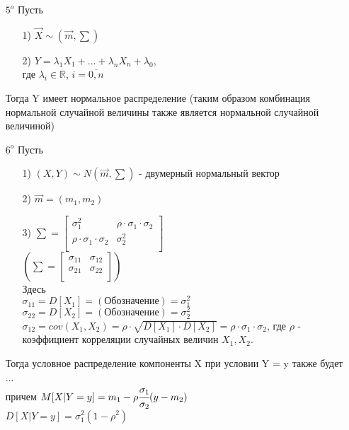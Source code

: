\begin{enumerate}
	\item[$5^o$] Пусть\\
	\begin{enumerate}
		\item[1)] $\vec{X} \sim (\vec{m}, \sum)$
		\item[2)] $Y = \lambda_1 X_1 + \ldots + \lambda_n X_n + \lambda_0$,\\
		где $\lambda_i \in \mathbb{R}$, $i = \overline{0, n}$
	\end{enumerate}
	Тогда Y имеет нормальное распределение (таким образом комбинация  нормальной случайной величины также является нормальной случайной величиной)
	
	\item[$6^o$] Пусть\\
	\begin{enumerate}
		\item[1)] $(X, Y) \sim N(\vec{m}, \sum)$ - двумерный нормальный вектор
		\item[2)] $\vec{m} = (m_1, m_2)$
		\item[3)] $\sum = 
		\begin{bmatrix}
			\sigma_1^2	&	\rho \cdot \sigma_1 \cdot \sigma_2		\\
			\rho \cdot \sigma_1 \cdot \sigma_2		&	\sigma_2^2	\\
		\end{bmatrix}$\\
		$\left( \sum = 
		\begin{bmatrix}
			\sigma_{11}	&	\sigma_{12}	\\
			\sigma_{21}	&	\sigma_{22}	\\
		\end{bmatrix}	\right)$\\
		Здесь\\
		$\sigma_{11} = D[X_1] = (\text{Обозначение}) = \sigma_1^2$\\
		$\sigma_{22} = D[X_2] = (\text{Обозначение}) = \sigma_2^2$\\
		$\sigma_{12} = cov(X_1, X_2) = \rho \cdot \sqrt{D[X_1] \cdot D[X_2]} = \rho \cdot \sigma_1 \cdot \sigma_2$, где $\rho$ - коэффициент корреляции случайных величин $X_1, X_2$.
	\end{enumerate}
	Тогда условное распределение компоненты X при условии Y = y также будет ...\\
	причем $M[X|Y = y] = m_1 - \rho \cfrac{\sigma_1}{\sigma_2} (y - m_2)$\\
	$D[X|Y = y] = \sigma_1^2 (1 - \rho^2)$
\end{enumerate}


